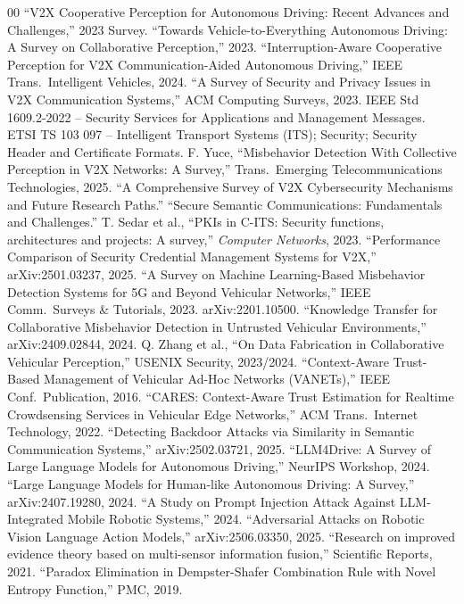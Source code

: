 \documentclass[conference]{IEEEtran}
\begin{document}
\begin{thebibliography}{00}
 ``V2X Cooperative Perception for Autonomous Driving: Recent Advances and Challenges,'' 2023 Survey.
 ``Towards Vehicle-to-Everything Autonomous Driving: A Survey on Collaborative Perception,'' 2023.
 ``Interruption-Aware Cooperative Perception for V2X Communication-Aided Autonomous Driving,'' IEEE Trans.\ Intelligent Vehicles, 2024.
 ``A Survey of Security and Privacy Issues in V2X Communication Systems,'' ACM Computing Surveys, 2023.
 IEEE Std 1609.2-2022 -- Security Services for Applications and Management Messages.
 ETSI TS 103 097 -- Intelligent Transport Systems (ITS); Security; Security Header and Certificate Formats.
 F. Yuce, ``Misbehavior Detection With Collective Perception in V2X Networks: A Survey,'' Trans.\ Emerging Telecommunications Technologies, 2025.
 ``A Comprehensive Survey of V2X Cybersecurity Mechanisms and Future Research Paths.''
 ``Secure Semantic Communications: Fundamentals and Challenges.''
 T. Sedar et al., ``PKIs in C-ITS: Security functions, architectures and projects: A survey,'' \emph{Computer Networks}, 2023.
 ``Performance Comparison of Security Credential Management Systems for V2X,'' arXiv:2501.03237, 2025.
 ``A Survey on Machine Learning-Based Misbehavior Detection Systems for 5G and Beyond Vehicular Networks,'' IEEE Comm.\ Surveys \& Tutorials, 2023. arXiv:2201.10500.
 ``Knowledge Transfer for Collaborative Misbehavior Detection in Untrusted Vehicular Environments,'' arXiv:2409.02844, 2024.
 Q. Zhang et al., ``On Data Fabrication in Collaborative Vehicular Perception,'' USENIX Security, 2023/2024.
 ``Context-Aware Trust-Based Management of Vehicular Ad-Hoc Networks (VANETs),'' IEEE Conf.\ Publication, 2016.
 ``CARES: Context-Aware Trust Estimation for Realtime Crowdsensing Services in Vehicular Edge Networks,'' ACM Trans.\ Internet Technology, 2022.
 ``Detecting Backdoor Attacks via Similarity in Semantic Communication Systems,'' arXiv:2502.03721, 2025.
 ``LLM4Drive: A Survey of Large Language Models for Autonomous Driving,'' NeurIPS Workshop, 2024.
 ``Large Language Models for Human-like Autonomous Driving: A Survey,'' arXiv:2407.19280, 2024.
 ``A Study on Prompt Injection Attack Against LLM-Integrated Mobile Robotic Systems,'' 2024.
 ``Adversarial Attacks on Robotic Vision Language Action Models,'' arXiv:2506.03350, 2025.
 ``Research on improved evidence theory based on multi-sensor information fusion,'' Scientific Reports, 2021.
 ``Paradox Elimination in Dempster-Shafer Combination Rule with Novel Entropy Function,'' PMC, 2019.
\end{thebibliography}
\end{document}
